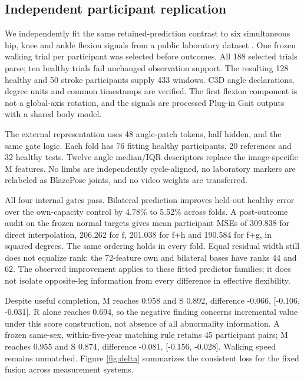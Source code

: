 \documentclass[letterpaper]{article}
\begin{document}
\subsection{Independent participant replication}

We independently fit the same retained-prediction contrast to six simultaneous hip, knee and ankle flexion signals from a public laboratory dataset \citep{vancriekinge2023dataset}. One frozen walking trial per participant was selected before outcomes. All 188 selected trials parse; ten healthy trials fail unchanged observation support. The resulting 128 healthy and 50 stroke participants supply 433 windows. C3D angle declarations, degree units and common timestamps are verified. The first flexion component is not a global-axis rotation, and the signals are processed Plug-in Gait outputs with a shared body model.

The external representation uses 48 angle-patch tokens, half hidden, and the same gate logic. Each fold has 76 fitting healthy participants, 20 references and 32 healthy tests. Twelve angle median/IQR descriptors replace the image-specific M features. No limbs are independently cycle-aligned, no laboratory markers are relabeled as BlazePose joints, and no video weights are transferred.

All four internal gates pass. Bilateral prediction improves held-out healthy error over the own-capacity control by 4.78\% to 5.52\% across folds. A post-outcome audit on the frozen normal targets gives mean participant MSEs of 309.838 for direct interpolation, 206.262 for f, 201.038 for f+h and 190.584 for f+g, in squared degrees. The same ordering holds in every fold. Equal residual width still does not equalize rank: the 72-feature own and bilateral bases have ranks 44 and 62. The observed improvement applies to these fitted predictor families; it does not isolate opposite-leg information from every difference in effective flexibility.

Despite useful completion, M reaches 0.958 and S 0.892, difference -0.066, {[}-0.106, -0.031{]}. R alone reaches 0.694, so the negative finding concerns incremental value under this score construction, not absence of all abnormality information. A frozen same-sex, within-five-year matching rule retains 45 participant pairs; M reaches 0.955 and S 0.874, difference -0.081, {[}-0.156, -0.028{]}. Walking speed remains unmatched. Figure \ref{fig:delta} summarizes the consistent loss for the fixed fusion across measurement systems.
\end{document}
